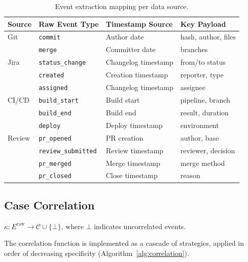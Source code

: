 \begin{table}[htbp]
\centering
\caption{Event extraction mapping per data source.}
\label{tab:event-extraction}
\small
\begin{tabular}{llll}
\toprule
\textbf{Source} & \textbf{Raw Event Type} & \textbf{Timestamp Source} & \textbf{Key Payload} \\
\midrule
Git    & \texttt{commit}            & Author date         & hash, author, files \\
       & \texttt{merge}             & Committer date      & branches \\
\midrule
Jira   & \texttt{status\_change}    & Changelog timestamp & from/to status \\
       & \texttt{created}           & Creation timestamp  & reporter, type \\
       & \texttt{assigned}          & Changelog timestamp & assignee \\
\midrule
CI/CD  & \texttt{build\_start}      & Build start         & pipeline, branch \\
       & \texttt{build\_end}        & Build end           & result, duration \\
       & \texttt{deploy}            & Deploy timestamp    & environment \\
\midrule
Review & \texttt{pr\_opened}        & PR creation         & author, base \\
       & \texttt{review\_submitted} & Review timestamp    & reviewer, decision \\
       & \texttt{pr\_merged}        & Merge timestamp     & merge method \\
       & \texttt{pr\_closed}        & Close timestamp     & reason \\
\bottomrule
\end{tabular}
\end{table}


\subsection{Case Correlation}
\label{sec:s1-correlation}

\begin{definition}
\label{def:correlation}
$\kappa : E^{\text{raw}} \to \mathcal{C} \cup \{\bot\}$, where $\bot$
indicates uncorrelated events.
\end{definition}

The correlation function is implemented as a cascade of strategies, applied
in order of decreasing specificity (Algorithm~\ref{alg:correlation}).

